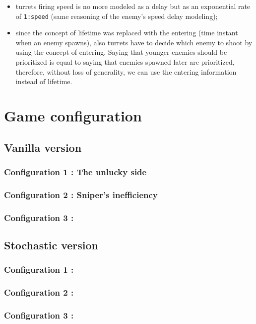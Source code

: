 \documentclass[
10pt, %
a4paper, %
oneside, %
headinclude,footinclude, %
BCOR5mm, %
]{scrartcl}
\begin{document}
\begin{itemize}
			\begin{itemize}
				\item turrets firing speed is no more modeled as a delay but as an exponential rate of \texttt{1:speed} (same reasoning of the enemy's speed delay modeling);
				\item since the concept of lifetime was replaced with the entering (time instant when an enemy spawns), also turrets have to decide which enemy to shoot by using the concept of entering. Saying that younger enemies should be prioritized is equal to saying that enemies spawned later are prioritized, therefore, without loss of generality, we can use the entering information instead of lifetime.
			\end{itemize}
	\end{itemize}
	
	\section{Game configuration}
	\subsection{Vanilla version}
	\subsubsection{Configuration 1 : The unlucky side}
	\subsubsection{Configuration 2 : Sniper's inefficiency}
	\subsubsection{Configuration 3 : }
	\subsection{Stochastic version}
	\subsubsection{Configuration 1 :}
	\subsubsection{Configuration 2 :}
	\subsubsection{Configuration 3 :}
	
\end{document}

